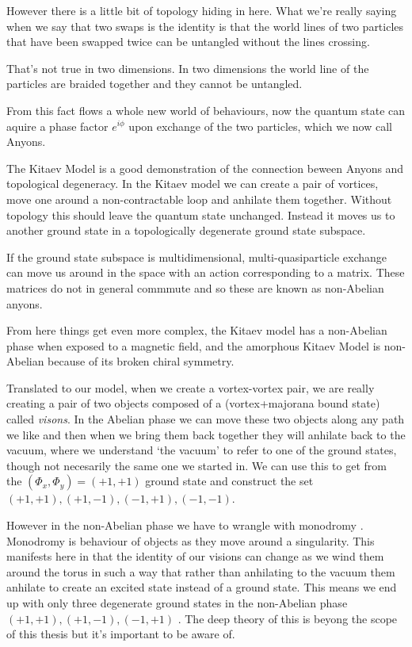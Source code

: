 However there is a little bit of topology hiding in here. What we're
really saying when we say that two swaps is the identity is that the
world lines of two particles that have been swapped twice can be
untangled without the lines crossing.

That's not true in two dimensions. In two dimensions the world line of
the particles are braided together and they cannot be untangled.

{}

From this fact flows a whole new world of behaviours, now the quantum
state can aquire a phase factor \(e^{i\phi}\) upon exchange of the two
particles, which we now call Anyons.

The Kitaev Model is a good demonstration of the connection beween Anyons
and topological degeneracy. In the Kitaev model we can create a pair of
vortices, move one around a non-contractable loop and anhilate them
together. Without topology this should leave the quantum state
unchanged. Instead it moves us to another ground state in a
topologically degenerate ground state subspace.

If the ground state subspace is multidimensional, multi-quasiparticle
exchange can move us around in the space with an action corresponding to
a matrix. These matrices do not in general commmute and so these are
known as non-Abelian anyons.

From here things get even more complex, the Kitaev model has a
non-Abelian phase when exposed to a magnetic field, and the amorphous
Kitaev Model is non-Abelian because of its broken chiral symmetry.

Translated to our model, when we create a vortex-vortex pair, we are
really creating a pair of two objects composed of a (vortex+majorana
bound state) called \emph{visons}. In the Abelian phase we can move
these two objects along any path we like and then when we bring them
back together they will anhilate back to the vacuum, where we understand
`the vacuum' to refer to one of the ground states, though not necesarily
the same one we started in. We can use this to get from the
\((\Phi_x, \Phi_y) = (+1, +1)\) ground state and construct the set
\((+1, +1), (+1, -1), (-1, +1), (-1, -1)\).

However in the non-Abelian phase we have to wrangle with monodromy
\autocite{chungExplicitMonodromyMoore2007,oshikawaTopologicalDegeneracyNonAbelian2007}.
Monodromy is behaviour of objects as they move around a singularity.
This manifests here in that the identity of our visions can change as we
wind them around the torus in such a way that rather than anhilating to
the vacuum them anhilate to create an excited state instead of a ground
state. This means we end up with only three degenerate ground states in
the non-Abelian phase \((+1, +1), (+1, -1), (-1, +1)\)
\autocite[yaoAlgebraicSpinLiquid2009a]{chungTopologicalQuantumPhase2010}.
The deep theory of this is beyong the scope of this thesis but it's
important to be aware of.

